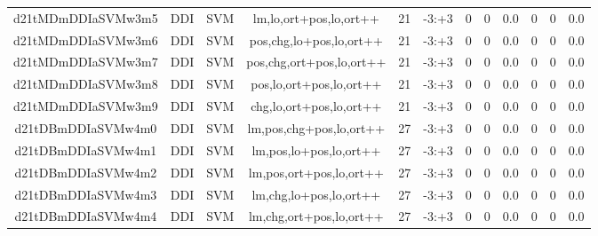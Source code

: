 \documentclass[a4paper]{article}
\begin{document}
\begin{landscape}
\begin{center}
\begin{tabular}{ |c|c|c|c|c|c|c|c|c|c|c|c|}
 
 	
 	\small{ d21tMDmDDIaSVMw3m5 } & \small{ DDI} & \small{  SVM }  & lm,lo,ort+pos,lo,ort++  &  21 &  \small{  -3:+3 }  &  0 & 0 & 0.0  &  0 & 0 & 0.0 \\
 	

 
 	
 	\small{ d21tMDmDDIaSVMw3m6 } & \small{ DDI} & \small{  SVM }  & pos,chg,lo+pos,lo,ort++  &  21 &  \small{  -3:+3 }  &  0 & 0 & 0.0  &  0 & 0 & 0.0 \\
 	

 
 	
 	\small{ d21tMDmDDIaSVMw3m7 } & \small{ DDI} & \small{  SVM }  & pos,chg,ort+pos,lo,ort++  &  21 &  \small{  -3:+3 }  &  0 & 0 & 0.0  &  0 & 0 & 0.0 \\
 	

 
 	
 	\small{ d21tMDmDDIaSVMw3m8 } & \small{ DDI} & \small{  SVM }  & pos,lo,ort+pos,lo,ort++  &  21 &  \small{  -3:+3 }  &  0 & 0 & 0.0  &  0 & 0 & 0.0 \\
 	

 
 	
 	\small{ d21tMDmDDIaSVMw3m9 } & \small{ DDI} & \small{  SVM }  & chg,lo,ort+pos,lo,ort++  &  21 &  \small{  -3:+3 }  &  0 & 0 & 0.0  &  0 & 0 & 0.0 \\
 	

 
 	
 	\small{ d21tDBmDDIaSVMw4m0 } & \small{ DDI} & \small{  SVM }  & lm,pos,chg+pos,lo,ort++  &  27 &  \small{  -3:+3 }  &  0 & 0 & 0.0  &  0 & 0 & 0.0 \\
 	

 
 	
 	\small{ d21tDBmDDIaSVMw4m1 } & \small{ DDI} & \small{  SVM }  & lm,pos,lo+pos,lo,ort++  &  27 &  \small{  -3:+3 }  &  0 & 0 & 0.0  &  0 & 0 & 0.0 \\
 	

 
 	
 	\small{ d21tDBmDDIaSVMw4m2 } & \small{ DDI} & \small{  SVM }  & lm,pos,ort+pos,lo,ort++  &  27 &  \small{  -3:+3 }  &  0 & 0 & 0.0  &  0 & 0 & 0.0 \\
 	

 
 	
 	\small{ d21tDBmDDIaSVMw4m3 } & \small{ DDI} & \small{  SVM }  & lm,chg,lo+pos,lo,ort++  &  27 &  \small{  -3:+3 }  &  0 & 0 & 0.0  &  0 & 0 & 0.0 \\
 	

 
 	
 	\small{ d21tDBmDDIaSVMw4m4 } & \small{ DDI} & \small{  SVM }  & lm,chg,ort+pos,lo,ort++  &  27 &  \small{  -3:+3 }  &  0 & 0 & 0.0  &  0 & 0 & 0.0 \\
 	


\end{tabular}
\end{center}
\end{landscape}
\end{document}
